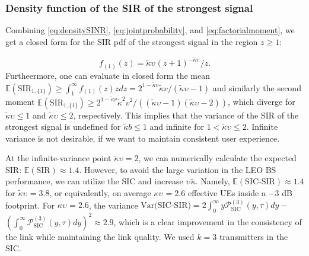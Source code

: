 \documentclass[lettersize,journal]{IEEEtran}
\begin{document}
\subsubsection{Density function of the SIR of the strongest signal}
Combining \eqref{eq:densitySINR}, \eqref{eq:jointprobability}, and \eqref{eq:factorialmoment}, we get a closed form for the SIR pdf of the strongest signal in the region $z\geq 1$:


\begin{equation}
  \label{eq:SIR1}
  f_{(1)}(z) =  {\tilde{\kappa}\upsilon_{}\left({z + 1} \right)^{-\tilde{\kappa}\upsilon_{}}}/{z}.
\end{equation}
Furtheermore, one can evaluate in closed form the mean $\mathbb{E}(\text{SIR}_{1,\{1\}})  \geq\int_{1}^{\infty}f_{(1)}(z)zdz=2^{1-\tilde{\kappa}v}\tilde{\kappa}v/(\tilde{\kappa}\upsilon-1)$ and similarly the second moment $\mathbb{E}(\text{SIR}_{1,\{1\}})  \geq 2^{1-\tilde{\kappa}v}\tilde{\kappa}^2v^2/((\tilde{\kappa}\upsilon-1)(\tilde{\kappa}\upsilon-2))$, which diverge for $\tilde{\kappa}\upsilon\leq 1$ and $\tilde{\kappa}\upsilon\leq 2$, respectively. This implies that the variance of the SIR of the strongest signal is undefined for $\tilde{\kappa}b \leq 1$ and infinite for $1 <\tilde{\kappa}\upsilon \leq 2$. Infinite variance is not desirable, if we want to maintain consistent user experience.


At the infinite-variance point $\tilde{\kappa}\upsilon =2$, we can numerically calculate the expected SIR: $\mathbb{E}(\text{SIR}) \approx 1.4$. However, to avoid the large variation in the LEO BS performance, we can utilize the SIC and increase $\upsilon_{} \tilde{\kappa}$. Namely, $\mathbb{E}(\text{SIC-SIR}) \approx 1.4$ for $\tilde{\kappa}\upsilon_{} = 3.8$, or equivalently, on average ${\kappa}\upsilon_{}=2.6$ effective UEs inside a $-3$ dB footprint. For ${\kappa}\upsilon_{}=2.6$, the variance $\text{Var(SIC-SIR)} = 2\int_{0}^{\infty}y\mathcal{P}_{\text{SIC}}^{(3)}(y,\tau)dy-$ $\left(\int_{0}^{\infty}\mathcal{P}_{\text{SIC}}^{(3)}(y,\tau)dy\right)^2 \approx 2.9$, which is a clear improvement in the consistency of the link while maintaining the link quality. We used $k=3$ transmitters in the SIC.
\end{document}
